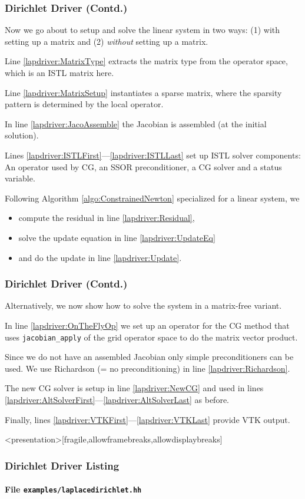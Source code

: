 \begin{frame}
\frametitle<presentation>{Dirichlet Driver (Contd.)}
Now we go about to setup and solve the linear system in two ways:
(1) with setting up a matrix and (2) \textit{without} setting up a
matrix.

Line \ref{lapdriver:MatrixType} extracts the matrix type from the
operator space, which is an ISTL matrix here.

Line \ref{lapdriver:MatrixSetup} instantiates a sparse matrix, where
the sparsity pattern is determined by the local operator.

In line \ref{lapdriver:JacoAssemble} the Jacobian is assembled (at the
initial solution).

Lines \ref{lapdriver:ISTLFirst}---\ref{lapdriver:ISTLLast} set up ISTL
solver components: An operator used by CG, an SSOR preconditioner, a
CG solver and a status variable.

Following Algorithm \ref{algo:ConstrainedNewton} specialized for a
linear system, we
\begin{itemize}
\item compute the residual in line \ref{lapdriver:Residual},
\item solve the update equation in line \ref{lapdriver:UpdateEq}
\item and do the update in line \ref{lapdriver:Update}.
\end{itemize}
\end{frame}

\begin{frame}
\frametitle<presentation>{Dirichlet Driver (Contd.)}
Alternatively, we now show how to solve the system in a matrix-free
variant.

In line \ref{lapdriver:OnTheFlyOp} we set up an operator for the CG
method that uses \lstinline{jacobian_apply} of the grid operator space
to do the matrix vector product.

Since we do not have an assembled Jacobian only simple preconditioners
can be used. We use Richardson (= no preconditioning) in
line \ref{lapdriver:Richardson}.

The new CG solver is setup in line \ref{lapdriver:NewCG} and used in
lines \ref{lapdriver:AltSolverFirst}---\ref{lapdriver:AltSolverLast}
as before.

Finally, lines \ref{lapdriver:VTKFirst}---\ref{lapdriver:VTKLast}
provide VTK output.
\end{frame}

\begin{frame}<presentation>[fragile,allowframebreaks,allowdisplaybreaks]
\frametitle<presentation>{Dirichlet Driver Listing}
\framesubtitle<presentation>{File \texttt{examples/laplacedirichlet.hh}}

\end{frame}

